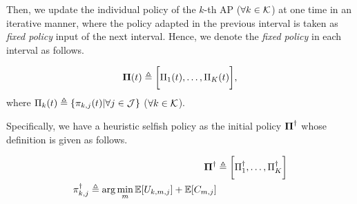 Then, we update the individual policy of the $k$-th AP ($\forall k\in\mathcal{K}$) at one time in an iterative manner, where the policy adapted in the previous interval is taken as \emph{fixed policy} input of the next interval.
Hence, we denote the \emph{fixed policy} in each interval as follows.
\begin{definition}
    \begin{align}
        \boldsymbol{\Pi}(t) \triangleq \bigg[\Pi_{1}(t), \dots, \Pi_{K}(t)\bigg],
    \end{align}
    where $\Pi_{k}(t) \triangleq \{\pi_{k,j}(t) | \forall j\in\mathcal{J}\}$ ($\forall k\in\mathcal{K}$).
\end{definition}
Specifically, we have a heuristic selfish policy as the initial policy $\boldsymbol{\Pi}^{\dagger}$ whose definition is given as follows.
\begin{definition}
    \begin{align}
        \boldsymbol{\Pi}^{\dagger} &\triangleq \bigg[ \Pi^{\dagger}_{1}, \dots, \Pi^{\dagger}_{K} \bigg]
        \\
        \pi^{\dagger}_{k,j} \triangleq \arg\min_{m} \mathbb{E}[U_{k,m,j}] + \mathbb{E}[C_{m,j}]
    \end{align}
\end{definition}

